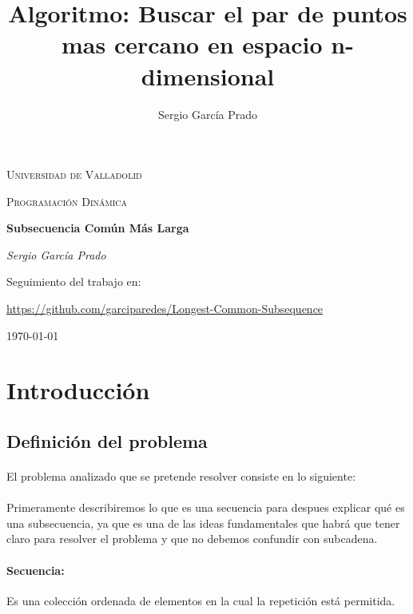 \documentclass{article}
\title{Algoritmo: Buscar el par de puntos mas cercano en espacio n-dimensional}
\author{Sergio García Prado}
\begin{document}
\begin{titlepage}
	\centering
	{\scshape\LARGE Universidad de Valladolid \par}
	\vspace{1cm}
	{\scshape\Large Programación Dinámica\par}
	\vspace{1.5cm}
	{\huge\bfseries Subsecuencia Común Más Larga\par}
	\vspace{2cm}
	{\Large\itshape Sergio García Prado\par}
	
	\vfill
	Seguimiento del trabajo en: \par
	\href{https://github.com/garciparedes/Longest-Common-Subsequence}{https://github.com/garciparedes/Longest-Common-Subsequence}

	\vfill


	{\large \today\par}
\end{titlepage}

\section{Introducción}
	
	\subsection{Definición del problema}
	
		\paragraph{}
		El problema analizado que se pretende resolver consiste en lo siguiente:
		
		\paragraph{}
		Primeramente describiremos lo que es una secuencia para despues explicar qué es una subsecuencia, ya que es una de las ideas fundamentales que habrá que tener claro para resolver el problema y que no debemos confundir con subcadena.
		
		\paragraph{Secuencia:}
		Es una colección ordenada de elementos en la cual la repetición está permitida.
\end{document}
